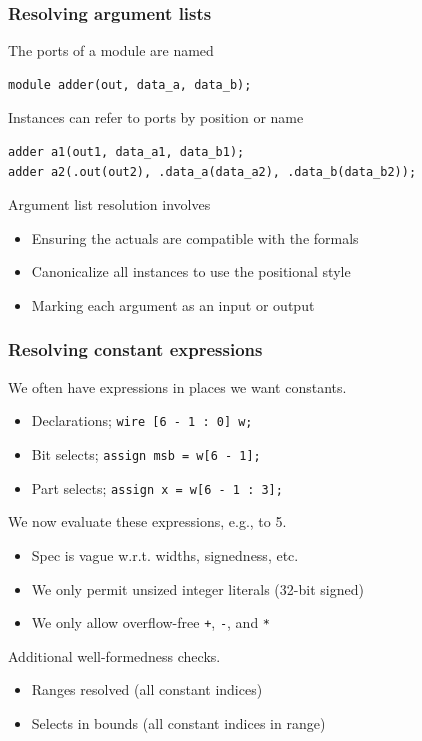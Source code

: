\documentclass[mathserif]{beamer}
\begin{document}
\begin{frame}[fragile]
\frametitle{Resolving argument lists}

The ports of a module are named

\begin{verbatim}
module adder(out, data_a, data_b);
\end{verbatim}

Instances can refer to ports by position or name

\begin{verbatim}
adder a1(out1, data_a1, data_b1);
adder a2(.out(out2), .data_a(data_a2), .data_b(data_b2));
\end{verbatim}

Argument list resolution involves
\begin{itemize}
\item Ensuring the actuals are compatible with the formals
\item Canonicalize all instances to use the positional style
\item Marking each argument as an input or output
\end{itemize}

\end{frame}


\begin{frame}
\frametitle{Resolving constant expressions}

We often have expressions in places we want constants.
\begin{itemize}
\item Declarations; \texttt{wire [6~-~1~:~0] w;}
\item Bit selects;  \texttt{assign msb = w[6~-~1];}
\item Part selects; \texttt{assign x = w[6~-~1~:~3];}
\end{itemize}

\bigskip
We now evaluate these expressions, e.g., to 5.
\begin{itemize}
\item Spec is vague w.r.t. widths, signedness, etc.
\item We only permit unsized integer literals (32-bit signed)
\item We only allow overflow-free \texttt{+}, \texttt{-}, and \texttt{*}
\end{itemize}

\bigskip
Additional well-formedness checks.  
\begin{itemize}
\item Ranges resolved (all constant indices)
\item Selects in bounds (all constant indices in range)
\end{itemize}
\end{frame}
\end{document}
